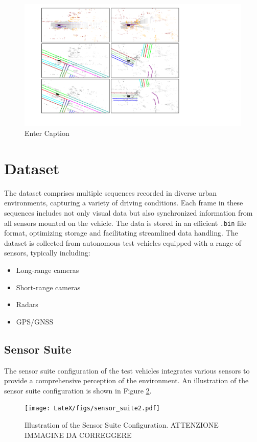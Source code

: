\begin{figure}[H]
    \centering
    \includegraphics[width=0.85\linewidth]{LateX//figs/post_proc.pdf}
    \caption{Enter Caption}
    \label{fig:enter-label}
\end{figure}

\section{Dataset}

The dataset comprises multiple sequences recorded in diverse urban environments, capturing a variety of driving conditions. Each frame in these sequences includes not only visual data but also synchronized information from all sensors mounted on the vehicle. The data is stored in an efficient \texttt{.bin} file format, optimizing storage and facilitating streamlined data handling. The dataset is collected from autonomous test vehicles equipped with a range of sensors, typically including:
\begin{itemize}
    \item Long-range cameras
    \item Short-range cameras
    \item Radars
    \item GPS/GNSS
\end{itemize}

\subsection{Sensor Suite}

The sensor suite configuration of the test vehicles integrates various sensors to provide a comprehensive perception of the environment. An illustration of the sensor suite configuration is shown in Figure \ref{fig:sensor-suite}. 
\begin{figure}[H]
    \centering
    \texttt{[image: LateX/figs/sensor\_suite2.pdf]}
    \caption{Illustration of the Sensor Suite Configuration. ATTENZIONE IMMAGINE DA CORREGGERE}
    \label{fig:sensor-suite}
\end{figure}

